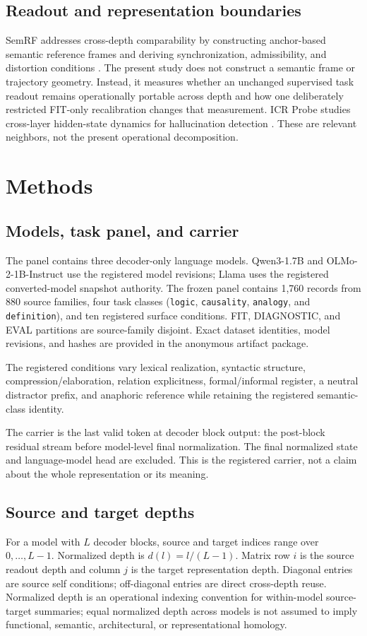 \documentclass{article}
\begin{document}
\subsection{Readout and representation boundaries}
SemRF addresses cross-depth comparability by constructing anchor-based semantic reference frames and deriving synchronization, admissibility, and distortion conditions \citep{semrf2026semantic}. The present study does not construct a semantic frame or trajectory geometry. Instead, it measures whether an unchanged supervised task readout remains operationally portable across depth and how one deliberately restricted FIT-only recalibration changes that measurement. ICR Probe studies cross-layer hidden-state dynamics for hallucination detection \citep{icrprobe2025tracking}. These are relevant neighbors, not the present operational decomposition.

\section{Methods}
\subsection{Models, task panel, and carrier}
The panel contains three decoder-only language models. Qwen3-1.7B and OLMo-2-1B-Instruct use the registered model revisions; Llama uses the registered converted-model snapshot authority. The frozen panel contains 1,760 records from 880 source families, four task classes (\texttt{logic}, \texttt{causality}, \texttt{analogy}, and \texttt{definition}), and ten registered surface conditions. FIT, DIAGNOSTIC, and EVAL partitions are source-family disjoint. Exact dataset identities, model revisions, and hashes are provided in the anonymous artifact package.

The registered conditions vary lexical realization, syntactic structure, compression/elaboration, relation explicitness, formal/informal register, a neutral distractor prefix, and anaphoric reference while retaining the registered semantic-class identity.

The carrier is the last valid token at decoder block output: the post-block residual stream before model-level final normalization. The final normalized state and language-model head are excluded. This is the registered carrier, not a claim about the whole representation or its meaning.

\subsection{Source and target depths}
For a model with $L$ decoder blocks, source and target indices range over $0,\ldots,L-1$. Normalized depth is $d(l)=l/(L-1)$. Matrix row $i$ is the source readout depth and column $j$ is the target representation depth. Diagonal entries are source self conditions; off-diagonal entries are direct cross-depth reuse. Normalized depth is an operational indexing convention for within-model source-target summaries; equal normalized depth across models is not assumed to imply functional, semantic, architectural, or representational homology.
\end{document}
